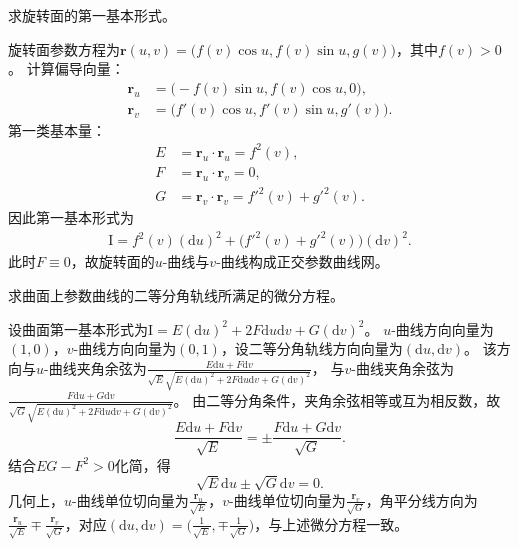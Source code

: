 \documentclass[../../main.tex]{subfiles}%
\begin{document}
\begin{example}
求旋转面的第一基本形式。
\end{example}
\begin{solution}

旋转面参数方程为$\boldsymbol{r}(u,v)=\big(f(v)\cos u,f(v)\sin u,g(v)\big)$，其中$f(v)>0$。
计算偏导向量：
\begin{align*}
\boldsymbol{r}_u&=\big(-f(v)\sin u,f(v)\cos u,0\big),\\
\boldsymbol{r}_v&=\big(f'(v)\cos u,f'(v)\sin u,g'(v)\big).
\end{align*}
第一类基本量：
\begin{align*}
E&=\boldsymbol{r}_u\cdot\boldsymbol{r}_u=f^2(v),\\
F&=\boldsymbol{r}_u\cdot\boldsymbol{r}_v=0,\\
G&=\boldsymbol{r}_v\cdot\boldsymbol{r}_v=f'^2(v)+g'^2(v).
\end{align*}
因此第一基本形式为
\begin{align*}
\mathrm{I}=f^2(v)(\mathrm{d}u)^2+\big(f'^2(v)+g'^2(v)\big)(\mathrm{d}v)^2.
\end{align*}
此时$F\equiv0$，故旋转面的$u$-曲线与$v$-曲线构成正交参数曲线网。

\end{solution}


\begin{example}
求曲面上参数曲线的二等分角轨线所满足的微分方程。
\end{example}
\begin{solution}

设曲面第一基本形式为$\mathrm{I}=E(\mathrm{d}u)^2+2F\mathrm{d}u\mathrm{d}v+G(\mathrm{d}v)^2$。
$u$-曲线方向向量为$(1,0)$，$v$-曲线方向向量为$(0,1)$，设二等分角轨线方向向量为$(\mathrm{d}u,\mathrm{d}v)$。
该方向与$u$-曲线夹角余弦为$\frac{E\mathrm{d}u+F\mathrm{d}v}{\sqrt{E}\sqrt{E(\mathrm{d}u)^2+2F\mathrm{d}u\mathrm{d}v+G(\mathrm{d}v)^2}}$，
与$v$-曲线夹角余弦为$\frac{F\mathrm{d}u+G\mathrm{d}v}{\sqrt{G}\sqrt{E(\mathrm{d}u)^2+2F\mathrm{d}u\mathrm{d}v+G(\mathrm{d}v)^2}}$。
由二等分角条件，夹角余弦相等或互为相反数，故
\[
\frac{E\mathrm{d}u+F\mathrm{d}v}{\sqrt{E}}=\pm\frac{F\mathrm{d}u+G\mathrm{d}v}{\sqrt{G}}.
\]
结合$EG-F^2>0$化简，得
\[
\sqrt{E}\mathrm{d}u\pm\sqrt{G}\mathrm{d}v=0.
\]
几何上，$u$-曲线单位切向量为$\frac{\boldsymbol{r}_u}{\sqrt{E}}$，$v$-曲线单位切向量为$\frac{\boldsymbol{r}_v}{\sqrt{G}}$，角平分线方向为$\frac{\boldsymbol{r}_u}{\sqrt{E}}\mp\frac{\boldsymbol{r}_v}{\sqrt{G}}$，对应$(\mathrm{d}u,\mathrm{d}v)=\big(\frac{1}{\sqrt{E}},\mp\frac{1}{\sqrt{G}}\big)$，与上述微分方程一致。

\end{solution}
\end{document}
